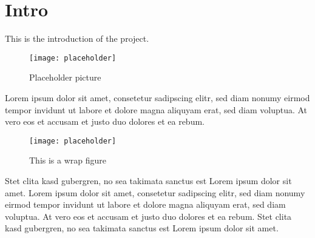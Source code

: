 \section{Intro}

This is the introduction of the project.

\begin{figure}[h]
  \centering
  \texttt{[image: placeholder]}
  \caption{Placeholder picture}
\end{figure}

Lorem ipsum dolor sit amet, consetetur sadipscing elitr, sed diam nonumy eirmod tempor invidunt ut labore et
dolore magna aliquyam erat, sed diam voluptua. At vero eos et accusam et justo duo dolores et ea rebum.

\begin{wrapfigure}{r}{0.5\textwidth}
  \begin{center}
    \texttt{[image: placeholder]}
  \end{center}
  \caption{This is a wrap figure}
\end{wrapfigure}

Stet clita kasd gubergren, no sea takimata sanctus est Lorem ipsum dolor sit amet. Lorem ipsum dolor sit amet,
consetetur sadipscing elitr, sed diam nonumy eirmod tempor invidunt ut labore et dolore magna aliquyam erat, 
sed diam voluptua. At vero eos et accusam et justo duo dolores et ea rebum. Stet clita kasd gubergren, no sea 
takimata sanctus est Lorem ipsum dolor sit amet.



\clearpage
